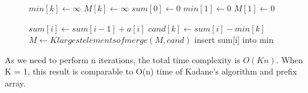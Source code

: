 \begin{figure}[H]
\begin{center}
\end{center}
\begin{algorithmic}[1]
        \State $min[k] \gets \infty$
        \State $M[k] \gets \infty$
    \EndFor
    \State $sum[0] \gets 0$
    \State $min[1] \gets 0$
    \State $M[1] \gets 0$

        \State $sum[i] \gets sum[i - 1] + a[i]$
            \State $cand[k] \gets sum[i] - min[k]$
        \EndFor
        \State $M \gets K largest elements of merge(M, cand)$
        \State insert sum[i] into min
    \EndFor
\EndFunction
\end{algorithmic}
\end{figure}

As we need to perform n iterations, the total time complexity is $O(Kn)$. When K = 1, this result is comparable to O(n) time of Kadane\rq{}s algorithm and prefix array.




